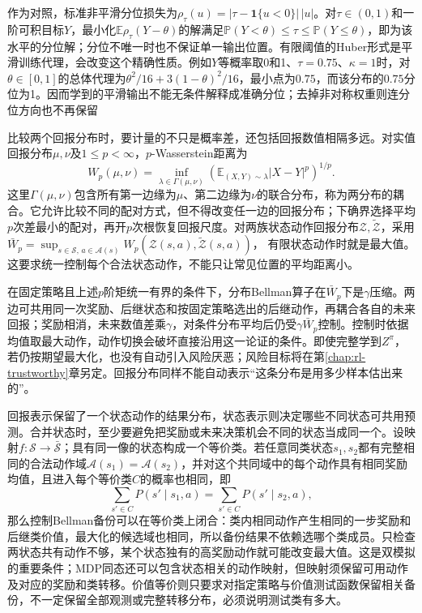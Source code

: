 作为对照，标准非平滑分位损失为$\rho_\tau(u)=|\tau-\mathbf1\{u<0\}|\,|u|$。对$\tau\in(0,1)$和一阶可积目标$Y$，最小化$\mathbb E\rho_\tau(Y-\theta)$的解满足$\mathbb P(Y<\theta)\leq\tau\leq\mathbb P(Y\leq\theta)$，即为该水平的分位解；分位不唯一时也不保证单一输出位置。有限阈值的Huber形式是平滑训练代理，会改变这个精确性质。例如$Y$等概率取0和1、$\tau=0.75$、$\kappa=1$时，对$\theta\in[0,1]$的总体代理为$\theta^2/16+3(1-\theta)^2/16$，最小点为$0.75$，而该分布的$0.75$分位为1。因而学到的平滑输出不能无条件解释成准确分位；去掉非对称权重则连分位方向也不再保留

比较两个回报分布时，要计量的不只是概率差，还包括回报数值相隔多远。对实值回报分布$\mu,\nu$及$1\leq p<\infty$，$p$-Wasserstein距离为
\[
  W_p(\mu,\nu)=
    \inf_{\lambda\in\Gamma(\mu,\nu)}
       \left(\mathbb E_{(X,Y)\sim\lambda}|X-Y|^p\right)^{1/p}.
\]
这里$\Gamma(\mu,\nu)$包含所有第一边缘为$\mu$、第二边缘为$\nu$的联合分布，称为两分布的耦合。它允许比较不同的配对方式，但不得改变任一边的回报分布；下确界选择平均$p$次差最小的配对，再开$p$次根恢复回报尺度。对两族状态动作回报分布$\mathcal Z,\widetilde{\mathcal Z}$，采用
$\bar W_p=\sup_{s\in\mathcal S,\,a\in\mathcal A(s)}
W_p(\mathcal Z(s,a),\widetilde{\mathcal Z}(s,a))$，
有限状态动作时就是最大值。这要求统一控制每个合法状态动作，不能只让常见位置的平均距离小。

在固定策略且上述$p$阶矩统一有界的条件下，分布Bellman算子在$\bar W_p$下是$\gamma$压缩。两边可共用同一次奖励、后继状态和按固定策略选出的后继动作，再耦合各自的未来回报；奖励相消，未来数值差乘$\gamma$，对条件分布平均后仍受$\gamma\bar W_p$控制。控制时依据均值取最大动作，动作切换会破坏直接沿用这一论证的条件。即使完整学到$Z^\pi$，若仍按期望最大化，也没有自动引入风险厌恶；风险目标将在第\ref{chap:rl-trustworthy}章另定。回报分布同样不能自动表示“这条分布是用多少样本估出来的”。

回报表示保留了一个状态动作的结果分布，状态表示则决定哪些不同状态可共用预测。合并状态时，至少要避免把奖励或未来决策机会不同的状态当成同一个。设映射$f:\mathcal S\to\bar{\mathcal S}$；具有同一像的状态构成一个等价类。若任意同类状态$s_1,s_2$都有完整相同的合法动作域$\mathcal A(s_1)=\mathcal A(s_2)$，并对这个共同域中的每个动作具有相同奖励均值，且进入每个等价类$C$的概率也相同，即
\[
  \sum_{s'\in C}P(s'\mid s_1,a)
       =\sum_{s'\in C}P(s'\mid s_2,a),
\]
那么控制Bellman备份可以在等价类上闭合：类内相同动作产生相同的一步奖励和后继类价值，最大化的候选域也相同，所以备份结果不依赖选哪个类成员。只检查两状态共有动作不够，某个状态独有的高奖励动作就可能改变最大值。这是双模拟的重要条件；MDP同态还可以包含状态相关的动作映射，但映射须保留可用动作及对应的奖励和类转移。价值等价则只要求对指定策略与价值测试函数保留相关备份，不一定保留全部观测或完整转移分布，必须说明测试类有多大。

